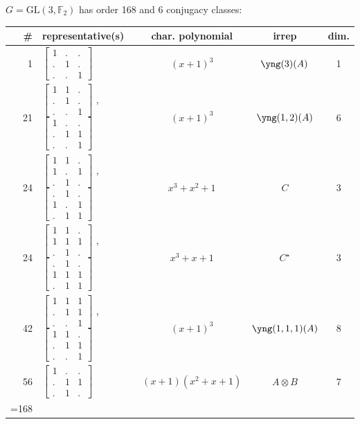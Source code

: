 \documentclass[11pt,oneside]{article}
\newcommand{\GL}{\mathrm{GL}}
\newcommand{\Field}{\mathbb{F}}
\newcommand{\tensor}{\otimes}
\begin{document}
$G=\GL(3,\Field_2)$ has order 168 and 6 conjugacy classes:
\begin{center}
\begin{tabular}{r|l|c|c|c}
\# & representative(s) & char. polynomial & irrep & dim. \\
\hline
 1 & $\begin{bmatrix}1&.&.\\.&1&.\\.&.&1\end{bmatrix}$ & $(x+1)^3$  
    & $\yng(3)(A)$ & 1 \\
21 & $\begin{bmatrix}1&1&.\\.&1&.\\.&.&1\end{bmatrix}$ ,
     $\begin{bmatrix}1&.&.\\.&1&1\\.&.&1\end{bmatrix}$ & $(x+1)^3$  
    & $\yng(1,2)(A)$ & 6  \\
24 & 
$\begin{bmatrix}1&1&.\\1&.&1\\.&1&.\end{bmatrix}$
,
$\begin{bmatrix}.&1&.\\1&.&1\\.&1&1\end{bmatrix}$
& $x^3+x^2+1$      & $C$ & 3 \\
24 & 
$\begin{bmatrix}1&1&.\\1&1&1\\.&1&.\end{bmatrix}$
,
$\begin{bmatrix}.&1&.\\1&1&1\\.&1&1\end{bmatrix}$
& $x^3+x+1$        & $C^{\star}$ & 3 \\
42 & $\begin{bmatrix}1&1&1\\.&1&1\\.&.&1\end{bmatrix}$
    ,  $\begin{bmatrix}1&1&.\\.&1&1\\.&.&1\end{bmatrix}$
    & $(x+1)^3$ 
    & $\yng(1,1,1)(A)$ & 8  \\
56 & $\begin{bmatrix}1&.&.\\.&1&1\\.&1&.\end{bmatrix}$ & $(x+1)(x^2+x+1)$
    & $A\tensor B$ & 7 \\
\hline
\strut =168 \\
\end{tabular}
\end{center}
\end{document}
